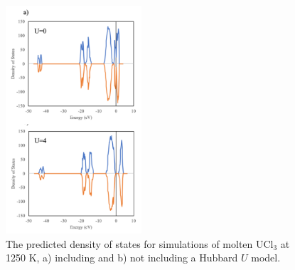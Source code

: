 \documentclass[preprint,3p,10pt,twocolumn,number,sort&compress]{elsarticle}
\begin{document}

\begin{figure}[htb]
\centering
\includegraphics[width=0.45\textwidth]{./figures/figure2.png}
\caption{The predicted density of states for simulations of molten UCl$_3$ at 1250 K, a) including and b) not including a Hubbard $U$ model.} 
\label{fig:DOS}
\end{figure}
\end{document}
